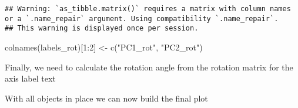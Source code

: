 \documentclass[
]{article}
\newenvironment{Shaded}{\begin{snugshade}}{\end{snugshade}}
\newcommand{\DecValTok}[1]{\textcolor[rgb]{0.00,0.00,0.81}{#1}}
\newcommand{\FunctionTok}[1]{\textcolor[rgb]{0.00,0.00,0.00}{#1}}
\newcommand{\NormalTok}[1]{#1}
\newcommand{\OtherTok}[1]{\textcolor[rgb]{0.56,0.35,0.01}{#1}}
\newcommand{\SpecialCharTok}[1]{\textcolor[rgb]{0.00,0.00,0.00}{#1}}
\newcommand{\StringTok}[1]{\textcolor[rgb]{0.31,0.60,0.02}{#1}}
\begin{document}
\begin{verbatim}
## Warning: `as_tibble.matrix()` requires a matrix with column names or a `.name_repair` argument. Using compatibility `.name_repair`.
## This warning is displayed once per session.
\end{verbatim}

\begin{Shaded}
\begin{Highlighting}[]
\FunctionTok{colnames}\NormalTok{(labels\_rot)[}\DecValTok{1}\SpecialCharTok{:}\DecValTok{2}\NormalTok{] }\OtherTok{\textless{}{-}} \FunctionTok{c}\NormalTok{(}\StringTok{"PC1\_rot"}\NormalTok{, }\StringTok{"PC2\_rot"}\NormalTok{)}
\end{Highlighting}
\end{Shaded}

Finally, we need to calculate the rotation angle from the rotation
matrix for the axis label text

\begin{Shaded}
\end{Shaded}

With all objects in place we can now build the final plot
\end{document}
